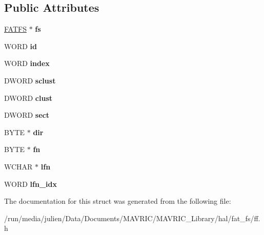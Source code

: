 \subsection*{Public Attributes}
\begin{DoxyCompactItemize}
\item 
\hypertarget{structDIR_a312eaa66cb703fb2993ea98173dc0c9a}{\hyperlink{structFATFS}{F\+A\+T\+F\+S} $\ast$ {\bfseries fs}}\label{structDIR_a312eaa66cb703fb2993ea98173dc0c9a}

\item 
\hypertarget{structDIR_aca2c95a99a04173917ec70c030891383}{W\+O\+R\+D {\bfseries id}}\label{structDIR_aca2c95a99a04173917ec70c030891383}

\item 
\hypertarget{structDIR_ab95119fbacbe45e3e9ee0f962b844092}{W\+O\+R\+D {\bfseries index}}\label{structDIR_ab95119fbacbe45e3e9ee0f962b844092}

\item 
\hypertarget{structDIR_a9212af5877b94d790dd3bab3aa320994}{D\+W\+O\+R\+D {\bfseries sclust}}\label{structDIR_a9212af5877b94d790dd3bab3aa320994}

\item 
\hypertarget{structDIR_acfbb8ba2d6e73b6f999ceffd1857c190}{D\+W\+O\+R\+D {\bfseries clust}}\label{structDIR_acfbb8ba2d6e73b6f999ceffd1857c190}

\item 
\hypertarget{structDIR_ad01fcc812ed0dad11a593574336adc9e}{D\+W\+O\+R\+D {\bfseries sect}}\label{structDIR_ad01fcc812ed0dad11a593574336adc9e}

\item 
\hypertarget{structDIR_a6c2a8c0cf2d55ae99775e93a16593449}{B\+Y\+T\+E $\ast$ {\bfseries dir}}\label{structDIR_a6c2a8c0cf2d55ae99775e93a16593449}

\item 
\hypertarget{structDIR_a32da2f31d6c3b6c42eef981cb0cfd2ee}{B\+Y\+T\+E $\ast$ {\bfseries fn}}\label{structDIR_a32da2f31d6c3b6c42eef981cb0cfd2ee}

\item 
\hypertarget{structDIR_af62fd789383e6f1397f74617e11c135d}{W\+C\+H\+A\+R $\ast$ {\bfseries lfn}}\label{structDIR_af62fd789383e6f1397f74617e11c135d}

\item 
\hypertarget{structDIR_acad41b18758c9278c14d47076e8149fc}{W\+O\+R\+D {\bfseries lfn\+\_\+idx}}\label{structDIR_acad41b18758c9278c14d47076e8149fc}

\end{DoxyCompactItemize}


The documentation for this struct was generated from the following file\+:\begin{DoxyCompactItemize}
\item 
/run/media/julien/\+Data/\+Documents/\+M\+A\+V\+R\+I\+C/\+M\+A\+V\+R\+I\+C\+\_\+\+Library/hal/fat\+\_\+fs/ff.\+h\end{DoxyCompactItemize}
